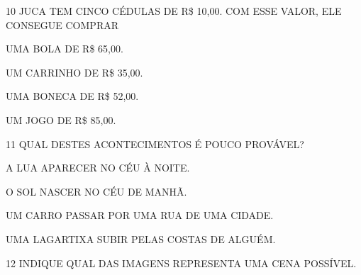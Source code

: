 \num{10} JUCA TEM CINCO CÉDULAS DE R\$ 10,00. COM ESSE VALOR, ELE CONSEGUE COMPRAR

\begin{escolha}[itemsep=0pt]
\item UMA BOLA DE R\$ 65,00.

\item UM CARRINHO DE R\$ 35,00.

\item UMA BONECA DE R\$ 52,00.

\item UM JOGO DE R\$ 85,00.
\end{escolha}

\num{11} QUAL DESTES ACONTECIMENTOS É POUCO PROVÁVEL?

\begin{escolha}[itemsep=0pt]
\item A LUA APARECER NO CÉU À NOITE.

\item O SOL NASCER NO CÉU DE MANHÃ.

\item UM CARRO PASSAR POR UMA RUA DE UMA CIDADE.

\item UMA LAGARTIXA SUBIR PELAS COSTAS DE ALGUÉM.
\end{escolha}

\pagebreak

\num{12} INDIQUE QUAL DAS IMAGENS REPRESENTA UMA CENA POSSÍVEL.


